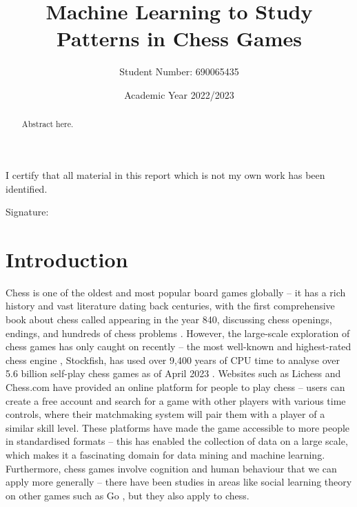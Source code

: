 \documentclass[a4paper, 11pt]{article}
\begin{document}
\title{Machine Learning to Study Patterns in Chess Games}
\author{Student Number: 690065435}
\date{Academic Year 2022/2023}

\maketitle

\newpage
\begin{abstract}
{Abstract here}.

\begin{center}
\end{center}
\end{abstract}

\vspace*{\fill}
\begin{center}

\vspace{1em}
I certify that all material in this report which is not my own work has been identified.
\end{center}
\vspace{1em}

Signature: \hrulefill

\newpage
\tableofcontents
\newpage

\section{Introduction}
Chess is one of the oldest and most popular board games globally -- it has a rich history and vast literature dating back centuries, with the first comprehensive book about chess called  appearing in the year 840, discussing chess openings, endings, and hundreds of chess problems \cite{earliestChessBooks,wonning2014short}. However, the large-scale exploration of chess games has only caught on recently -- the most well-known and highest-rated chess engine \cite{computerChessRatingLists}, Stockfish, has used over 9,400 years of CPU time to analyse over 5.6 billion self-play chess games as of April 2023 \cite{stockfishTestingFramework}. Websites such as Lichess and Chess.com have provided an online platform for people to play chess -- users can create a free account and search for a game with other players with various time controls, where their matchmaking system will pair them with a player of a similar skill level. These platforms have made the game accessible to more people in standardised formats -- this has enabled the collection of data on a large scale, which makes it a fascinating domain for data mining and machine learning. Furthermore, chess games involve cognition and human behaviour that we can apply more generally -- there have been studies in areas like social learning theory on other games such as Go \cite{beheim2014strategic}, but they also apply to chess.
\end{document}
